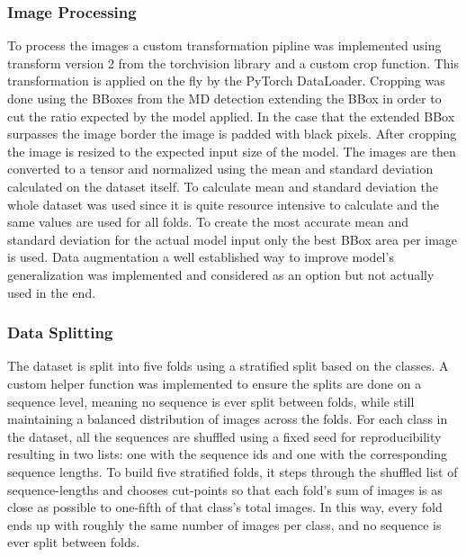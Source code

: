         \subsubsection{Image Processing}
        To process the images a custom transformation pipline was implemented using transform version 2 from the torchvision library and a custom crop function.
        This transformation is applied on the fly by the PyTorch DataLoader.
        Cropping was done using the BBoxes from the MD detection extending the BBox in order to cut the ratio expected by the model applied.
        In the case that the extended BBox surpasses the image border the image is padded with black pixels.
        After cropping the image is resized to the expected input size of the model.
        The images are then converted to a tensor and normalized using the mean and standard deviation calculated on the dataset itself.
        To calculate mean and standard deviation the whole dataset was used since it is quite resource intensive to calculate and the same values are used for all folds.
        To create the most accurate mean and standard deviation for the actual model input only the best BBox area per image is used.
        Data augmentation a well established way to improve model's generalization \autocite{shortenSurveyImageData2019} was implemented and considered as an option but not actually used in the end.

        \subsubsection{Data Splitting}

        The dataset is split into five folds using a stratified split based on the classes.
        A custom helper function was implemented to ensure the splits are done on a sequence level, meaning no sequence is ever split between folds, while still maintaining a balanced distribution of images across the folds.
        For each class in the dataset, all the sequences are shuffled using a fixed seed for reproducibility resulting in two lists: one with the sequence ids and one with the corresponding sequence lengths.
        To build five stratified folds, it steps through the shuffled list of sequence-lengths and chooses cut-points so that each fold's sum of images is as close as possible to one-fifth of that class's total images.
        In this way, every fold ends up with roughly the same number of images per class, and no sequence is ever split between folds.

